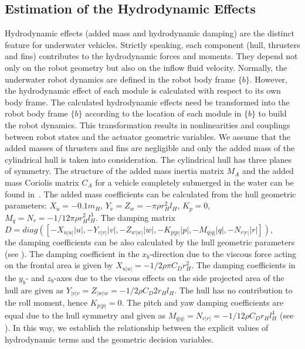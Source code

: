 \subsection{Estimation of the Hydrodynamic Effects}
Hydrodynamic effects (added mass and hydrodynamic damping) are the distinct feature for underwater vehicles. Strictly speaking, each component (hull, thrusters and fins) contributes to the hydrodynamic forces and moments. They depend not only on the robot geometry but also on the inflow fluid velocity. Normally, the underwater robot dynamics are defined in the robot body frame $\lbrace b \rbrace$. However, the hydrodynamic effect of each module is calculated with respect to its own body frame. The calculated hydrodynamic effects need be transformed into the robot body frame $\lbrace b \rbrace$ according to the location of each module in $\lbrace b \rbrace$ to build the robot dynamics. This transformation results in nonlinearities and couplings between robot states and the actuator geometric variables. We assume that the added masses of thrusters and fins are negligible and only the added mass of the cylindrical hull is taken into consideration. The cylindrical hull has three planes of symmetry. The structure of the added mass inertia matrix $M_{A}$ and the added mass Coriolis matrix $C_{A}$ for a vehicle completely submerged in the water can be found in~\cite{c9}. The added mass coefficients can be calculated from the hull geometric parameters: $X_{\dot{u}}=-0.1m_{H}$, $Y_{\dot{v}}=Z_{\dot{w}}=-\pi \rho r_{H}^{2}l_{H}$, $K_{\dot{p}}=0$, $M_{\dot{q}}=N_{\dot{r}}=-1/12\pi \rho r_{H}^{2}l_{H}^{3}$. The damping matrix $D=diag([-X_{u|u|}|u|,-Y_{v|v|}|v|,-Z_{w|w|}|w|,-K_{p|p|}|p|,-M_{q|q|}|q|,-N_{r|r|}|r|])$,\\ the damping coefficients can be also calculated by the hull geometric parameters (see \cite{c10}). The damping coefficient in the $x_b$-direction due to the viscous force acting on the frontal area is given by $X_{u|u|}=-1/2\rho \pi C_{D}r_{H}^{2}$. The damping coefficients in the $y_b$- and $z_b$-axes due to the viscous effects on the side projected area of the hull are given as $Y_{|v|v}=Z_{|w|w}=-1/2\rho C_{D}2r_{H}l_{H}$. The hull has no contribution to the roll moment, hence $K_{p|p|}=0$. The pitch and yaw damping coefficients are equal due to the hull symmetry and given as $M_{q|q|}=N_{r|r|}=-1/12\rho C_{D}r_{H}l_{H}^{4}$ (see \cite{c11}). In this way, we establish the relationship between the explicit values of hydrodynamic terms and the geometric decision variables. 

